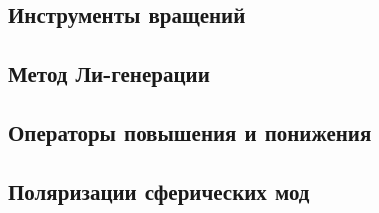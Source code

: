 \documentclass[\docroot/reports/draft/report.tex]{subfiles}
\begin{document}
\onlyinsubfile{\tableofcontents}

\subsection{Инструменты вращений}


\subsection{Метод Ли-генерации}


\subsection{Операторы повышения и понижения}


\subsection{Поляризации сферических мод}



\end{document}
